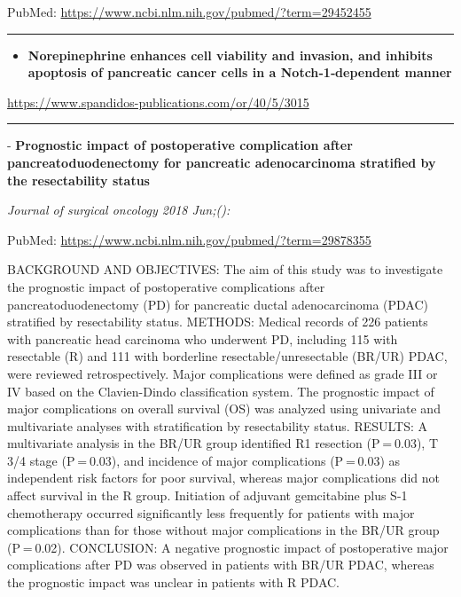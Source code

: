 \documentclass[]{article}
\providecommand{\tightlist}{%
  \setlength{\itemsep}{0pt}\setlength{\parskip}{0pt}}
\begin{document}
PubMed: \url{https://www.ncbi.nlm.nih.gov/pubmed/?term=29452455}

{}

{}

\begin{center}\rule{0.5\linewidth}{\linethickness}\end{center}

\begin{itemize}
\tightlist
\item
  \textbf{Norepinephrine enhances cell viability and invasion, and
  inhibits apoptosis of pancreatic cancer cells in a Notch‑1‑dependent
  manner}
\end{itemize}

\url{https://www.spandidos-publications.com/or/40/5/3015}

\begin{center}\rule{0.5\linewidth}{\linethickness}\end{center}

 - \textbf{Prognostic impact of postoperative complication after
pancreatoduodenectomy for pancreatic adenocarcinoma stratified by the
resectability status}

\emph{Journal of surgical oncology 2018 Jun;():}

PubMed: \url{https://www.ncbi.nlm.nih.gov/pubmed/?term=29878355}

BACKGROUND AND OBJECTIVES: The aim of this study was to investigate the
prognostic impact of postoperative complications after
pancreatoduodenectomy (PD) for pancreatic ductal adenocarcinoma (PDAC)
stratified by resectability status. METHODS: Medical records of 226
patients with pancreatic head carcinoma who underwent PD, including 115
with resectable (R) and 111 with borderline resectable/unresectable
(BR/UR) PDAC, were reviewed retrospectively. Major complications were
defined as grade III or IV based on the Clavien-Dindo classification
system. The prognostic impact of major complications on overall survival
(OS) was analyzed using univariate and multivariate analyses with
stratification by resectability status. RESULTS: A multivariate analysis
in the BR/UR group identified R1 resection (P = 0.03), T 3/4 stage
(P = 0.03), and incidence of major complications (P = 0.03) as
independent risk factors for poor survival, whereas major complications
did not affect survival in the R group. Initiation of adjuvant
gemcitabine plus S-1 chemotherapy occurred significantly less frequently
for patients with major complications than for those without major
complications in the BR/UR group (P = 0.02). CONCLUSION: A negative
prognostic impact of postoperative major complications after PD was
observed in patients with BR/UR PDAC, whereas the prognostic impact was
unclear in patients with R PDAC.
\end{document}
